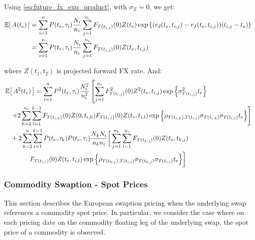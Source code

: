 Using \eqref{eq:future_fx_exp_product}, with $\sigma_{Z}=0$, we get:
\begin{equation}
\label{eq:exp_A_te_fx}
\begin{split}
\Ex{A(t_e)} &= \sum_{i=1}^{n} P(t_e, \tau_i) \frac{N_i}{n_i} \sum_{j=1}^{n_i} F_{T(t_{i,j})}(0) Z(t_e) \exp \left\{ (r_d(t_e, t_{i,j}) - r_f(t_e, t_{i,j})) (t_{i,j} - t_e) \right\} \\
            &= \sum_{i=1}^{n} P(t_e, \tau_i) \frac{N_i}{n_i} \sum_{j=1}^{n_i} F_{T(t_{i,j})}(0) Z(t_e, t_{i,j}) 
\end{split}
\end{equation}

where $Z(t_1, t_2)$ is projected forward FX rate. And:
\begin{equation}
\label{eq:exp_future_A_te_2_te_fx}
\begin{split}
& \Ex{A^2(t_e)} = \sum_{i=1}^{n} P^2(t_e, \tau_i) \frac{N^2_i}{n^2_i} \left[ \sum_{j=1}^{n_i} F^2_{T(t_{i,j})}(0)Z^2(t_e,t_{i,j}) \exp \left\{ \sigma^2_{T(t_{i,j})} t_e \right\} \right. \\
              &\quad \left. + 2 \sum_{k=2}^{n_i} \sum_{l=1}^{k-1} F_{T(t_{i,k})}(0)Z(0,t_{i,k}) F_{T(t_{i,l})}(0)Z(t_e,t_{i,l}) \exp \Big\{ \rho_{T(t_{i,k}), T(t_{i,l})} \sigma_{T(t_{i,k})} \sigma_{T(t_{i,l})} t_e \Big\} \right] \\
              &\quad + 2 \sum_{k=2}^{n} \sum_{i=1}^{k-1} P(t_e, \tau_k) P(t_e, \tau_i) \frac{N_k N_i}{n_k n_i} \bigg[ \sum_{j=1}^{n_k} \sum_{l=1}^{n_i} F_{T(t_{k,j})}(0) Z(t_e,t_{k,j}) \bigg. \\
              &\qquad \qquad \bigg. F_{T(t_{i,l})}(0) Z(t_e,t_{i,l}) \exp \Big\{ \rho_{T(t_{k,j}), T(t_{i,l})} \sigma_{T(t_{k,j})} \sigma_{T(t_{i,l})} t_e \Big\} \bigg]
\end{split}
\end{equation}


\subsubsection{Commodity Swaption - Spot Prices}
\label{pricing:com_swaption_spot_prices}

This section describes the European swaption pricing when the underlying swap references a commodity spot price. In particular, we consider the case where on each pricing date on the commodity floating leg of the underlying swap, the spot price of a commodity is observed.

